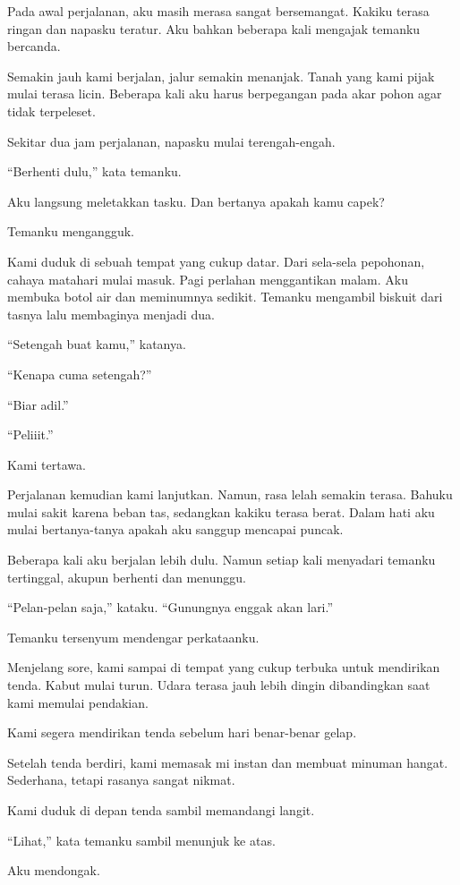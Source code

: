 Pada awal perjalanan, aku masih merasa sangat bersemangat. Kakiku terasa ringan dan napasku teratur. Aku bahkan beberapa kali mengajak temanku bercanda.


Semakin jauh kami berjalan, jalur semakin menanjak. Tanah yang kami pijak mulai terasa licin. Beberapa kali aku harus berpegangan pada akar pohon agar tidak terpeleset.


Sekitar dua jam perjalanan, napasku mulai terengah-engah.


“Berhenti dulu,” kata temanku.


Aku langsung meletakkan tasku. Dan bertanya apakah kamu capek?


Temanku mengangguk.


Kami duduk di sebuah tempat yang cukup datar. Dari sela-sela pepohonan, cahaya matahari mulai masuk. Pagi perlahan menggantikan malam. Aku membuka botol air dan meminumnya sedikit. Temanku mengambil biskuit dari tasnya lalu membaginya menjadi dua.


“Setengah buat kamu,” katanya.


“Kenapa cuma setengah?”


“Biar adil.”


“Peliiit.”


Kami tertawa.


Perjalanan kemudian kami lanjutkan. Namun, rasa lelah semakin terasa. Bahuku mulai sakit karena beban tas, sedangkan kakiku terasa berat. Dalam hati aku mulai bertanya-tanya apakah aku sanggup mencapai puncak.


Beberapa kali aku berjalan lebih dulu. Namun setiap kali menyadari temanku tertinggal, akupun berhenti dan menunggu.


“Pelan-pelan saja,” kataku. “Gunungnya enggak akan lari.”


Temanku tersenyum mendengar perkataanku.


Menjelang sore, kami sampai di tempat yang cukup terbuka untuk mendirikan tenda. Kabut mulai turun. Udara terasa jauh lebih dingin dibandingkan saat kami memulai pendakian.


Kami segera mendirikan tenda sebelum hari benar-benar gelap.


Setelah tenda berdiri, kami memasak mi instan dan membuat minuman hangat. Sederhana, tetapi rasanya sangat nikmat.


Kami duduk di depan tenda sambil memandangi langit.


“Lihat,” kata temanku sambil menunjuk ke atas.


Aku mendongak.


